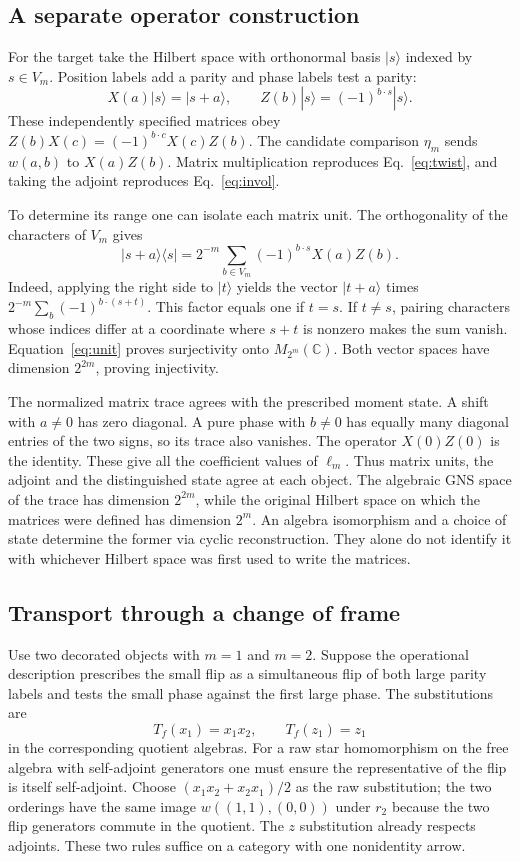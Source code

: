\documentclass[11pt,letterpaper]{article}
\begin{document}
\subsection{A separate operator construction}

For the target take the Hilbert space with orthonormal basis $|s\rangle$ indexed by $s\in V_m$. Position labels add a parity and phase labels test a parity:
\[
 X(a)|s\rangle=|s+a\rangle,\qquad
 Z(b)|s\rangle=(-1)^{b\cdot s}|s\rangle .
\]
These independently specified matrices obey $Z(b)X(c)=(-1)^{b\cdot c}X(c)Z(b)$. The candidate comparison $\eta_m$ sends $w(a,b)$ to $X(a)Z(b)$. Matrix multiplication reproduces Eq.~\eqref{eq:twist}, and taking the adjoint reproduces Eq.~\eqref{eq:invol}.

To determine its range one can isolate each matrix unit. The orthogonality of the characters of $V_m$ gives
\begin{equation}
 |s+a\rangle\langle s|
   =2^{-m}\sum_{b\in V_m}(-1)^{b\cdot s}X(a)Z(b).       \label{eq:unit}
\end{equation}
Indeed, applying the right side to $|t\rangle$ yields the vector $|t+a\rangle$ times $2^{-m}\sum_b(-1)^{b\cdot(s+t)}$. This factor equals one if $t=s$. If $t\ne s$, pairing characters whose indices differ at a coordinate where $s+t$ is nonzero makes the sum vanish. Equation~\eqref{eq:unit} proves surjectivity onto $M_{2^m}(\mathbb C)$. Both vector spaces have dimension $2^{2m}$, proving injectivity.

The normalized matrix trace agrees with the prescribed moment state. A shift with $a\ne0$ has zero diagonal. A pure phase with $b\ne0$ has equally many diagonal entries of the two signs, so its trace also vanishes. The operator $X(0)Z(0)$ is the identity. These give all the coefficient values of $\ell_m$. Thus matrix units, the adjoint and the distinguished state agree at each object. The algebraic GNS space of the trace has dimension $2^{2m}$, while the original Hilbert space on which the matrices were defined has dimension $2^m$. An algebra isomorphism and a choice of state determine the former via cyclic reconstruction. They alone do not identify it with whichever Hilbert space was first used to write the matrices.

\subsection{Transport through a change of frame}

Use two decorated objects with $m=1$ and $m=2$. Suppose the operational description prescribes the small flip as a simultaneous flip of both large parity labels and tests the small phase against the first large phase. The substitutions are
\[
 T_f(x_1)=x_1x_2,\qquad T_f(z_1)=z_1
\]
in the corresponding quotient algebras. For a raw star homomorphism on the free algebra with self-adjoint generators one must ensure the representative of the flip is itself self-adjoint. Choose $(x_1x_2+x_2x_1)/2$ as the raw substitution; the two orderings have the same image $w((1,1),(0,0))$ under $r_2$ because the two flip generators commute in the quotient. The $z$ substitution already respects adjoints. These two rules suffice on a category with one nonidentity arrow.
\end{document}
